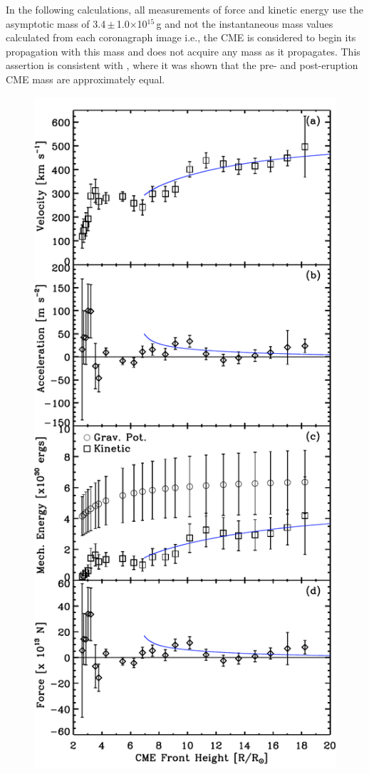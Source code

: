 In the following calculations, all measurements of force and kinetic energy use the asymptotic mass of 3.4\,$\pm$\,1.0$\times$10$^{15}$\,g and not the instantaneous mass values calculated from each coronagraph image i.e., the CME is considered to begin its propagation with this mass and does not acquire any mass as it propagates. This assertion is consistent with \citet{aschw09}, where it was shown that the pre- and post-eruption CME mass are approximately equal.

\begin{figure}[t!]
\begin{center}
\includegraphics[scale=0.6, trim=0cm 0cm 0cm 1cm]{images/20081212_force_v3.pdf}

\end{center}
\end{figure}
